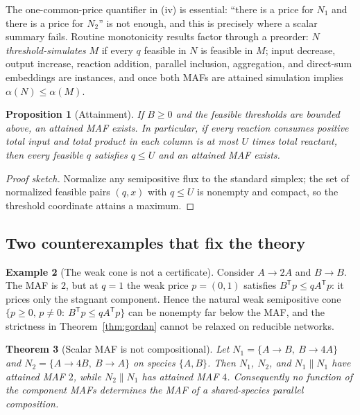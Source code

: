 \documentclass[11pt,a4paper]{article}
\theoremstyle{plain}
\newtheorem{theorem}{Theorem}[section]
\newtheorem{proposition}[theorem]{Proposition}
\theoremstyle{definition}
\newtheorem{example}[theorem]{Example}
\theoremstyle{remark}
\newcommand{\Tp}{^{\mathsf T}}
\begin{document}
The one-common-price quantifier in (iv) is essential: ``there is a price for $N_1$ and there is a price for $N_2$'' is not enough, and this is precisely where a scalar summary fails. Routine monotonicity results factor through a preorder: $N$ \emph{threshold-simulates} $M$ if every $q$ feasible in $N$ is feasible in $M$; input decrease, output increase, reaction addition, parallel inclusion, aggregation, and direct-sum embeddings are instances, and once both MAFs are attained simulation implies $\alpha(N)\le\alpha(M)$.

\begin{proposition}[Attainment]\label{prop:attain}
If $B\ge 0$ and the feasible thresholds are bounded above, an attained MAF exists. In particular, if every reaction consumes positive total input and total product in each column is at most $U$ times total reactant, then every feasible $q$ satisfies $q\le U$ and an attained MAF exists.
\end{proposition}

\begin{proof}[Proof sketch]
Normalize any semipositive flux to the standard simplex; the set of normalized feasible pairs $(q,x)$ with $q\le U$ is nonempty and compact, so the threshold coordinate attains a maximum.
\end{proof}

\subsection{Two counterexamples that fix the theory}

\begin{example}[The weak cone is not a certificate]\label{ex:weakcone}
Consider $A\to 2A$ and $B\to B$. The MAF is $2$, but at $q=1$ the weak price $p=(0,1)$ satisfies $B\Tp p\le qA\Tp p$: it prices only the stagnant component. Hence the natural weak semipositive cone $\{p\ge 0,\,p\ne 0:\ B\Tp p\le qA\Tp p\}$ can be nonempty far below the MAF, and the strictness in Theorem~\ref{thm:gordan} cannot be relaxed on reducible networks.
\end{example}

\begin{theorem}[Scalar MAF is not compositional]\label{thm:scalar-noncomp}
Let $N_1=\{A\to B,\ B\to 4A\}$ and $N_2=\{A\to 4B,\ B\to A\}$ on species $\{A,B\}$. Then $N_1$, $N_2$, and $N_1\parallel N_1$ have attained MAF $2$, while $N_2\parallel N_1$ has attained MAF $4$. Consequently no function of the component MAFs determines the MAF of a shared-species parallel composition.
\end{theorem}
\end{document}
